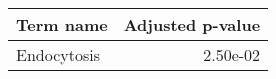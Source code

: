 \begin{tabular}{lr}
\toprule
  Term name &  Adjusted p-value \\
\midrule
Endocytosis &          2.50e-02 \\
\bottomrule
\end{tabular}
